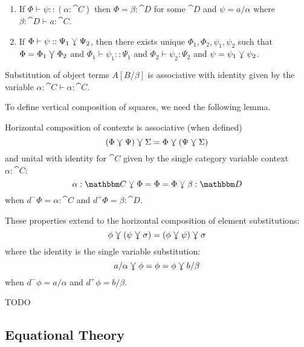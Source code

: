 \documentclass{llncs}
\begin{document}
\begin{lemma}[Inversion]
  \label{lem:inversion}
  \begin{enumerate}
  \item If $\Phi \vdash \psi :: (\alpha:\cat C)$ then $\Phi =
    \beta:\cat D$ for some $\cat D$ and $\psi = a/\alpha$ where
    $\beta:\cat D \vdash a : \cat C$.
  \item If $\Phi \vdash \psi :: \Psi_1 \curlyveedownarrow \Psi_2$, then there
    exists unique $\Phi_1,\Phi_2,\psi_1,\psi_2$ such that $\Phi =
    \Phi_1\curlyveedownarrow\Phi_2$ and $\Phi_1\vdash\psi_1 :: \Psi_1$ and
    $\Phi_2\vdash \psi_2 : \Psi_2$ and $\psi = \psi_1\curlyveedownarrow\psi_2$.
  \end{enumerate}
\end{lemma}

\begin{lemma}
  \label{lem:vertical-cat}
  Substitution of object terms $A[B/\beta]$ is associative with
  identity given by the variable $\alpha:\cat C \vdash \alpha:\cat C$.
\end{lemma}

To define vertical composition of squares, we need the following lemma.

\begin{lemma}
  Horizontal composition of contexts is associative (when defined)
  \[ (\Phi \curlyveedownarrow \Psi) \curlyveedownarrow \Sigma = \Phi \curlyveedownarrow (\Psi \curlyveedownarrow \Sigma) \]
  and unital with identity for $\cat C$ given by the single category
  variable context $\alpha:\cat C$:
  \[ \alpha:\cat C \jnctx \Phi = \Phi = \Phi \jnctx \beta:\cat D\]
  when $d^-\Phi = \alpha:\cat C$ and $d^+\Phi = \beta:\cat D$.

  These properties extend to the horizontal composition of element substitutions:
  \[ \phi \curlyveedownarrow (\psi \curlyveedownarrow \sigma) = (\phi \curlyveedownarrow \psi) \curlyveedownarrow \sigma \]
  where the identity is the single variable substitution:
  \[ a/\alpha \curlyveedownarrow \phi = \phi = \phi \curlyveedownarrow b/\beta \]
  when $d^-\phi = a/\alpha$ and $d^+\phi = b/\beta$.
\end{lemma}

\begin{lemma}
  TODO
\end{lemma}


\subsection{Equational Theory}
\end{document}
